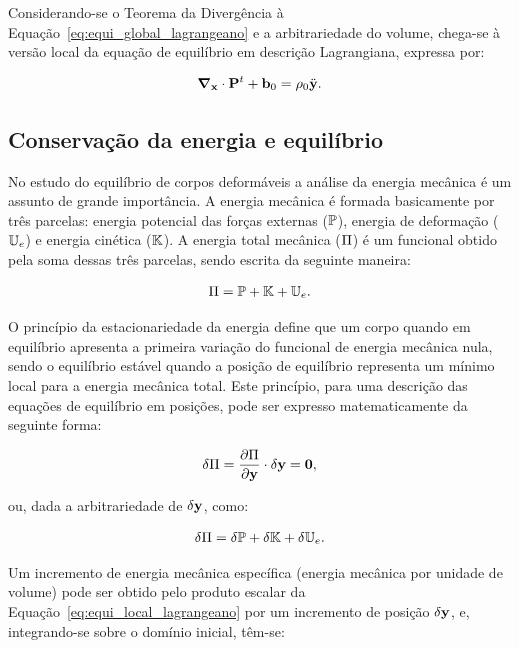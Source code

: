 Considerando-se o Teorema da Divergência à Equação~\eqref{eq:equi_global_lagrangeano} e a arbitrariedade do volume, chega-se à versão local da equação de equilíbrio em descrição Lagrangiana, expressa por:

\begin{align}
	\boldsymbol{\nabla}_{\mathbf{x}} \cdot \mathbf{P}^t +  \mathbf{b}_0 = \rho_0  \ddot{\mathbf{y}}. \label{eq:equi_local_lagrangeano}
\end{align}


\subsection{Conservação da energia e equilíbrio}

No estudo do equilíbrio de corpos deformáveis a análise da energia mecânica é um assunto de grande importância. A energia mecânica é formada basicamente por três parcelas: energia potencial das forças externas ($\mathbb{P}$), energia de deformação ($\mathbb{U}_e$) e energia cinética ($\mathbb{K}$). A energia total mecânica ($\Pi$) é um funcional obtido pela soma dessas três parcelas, sendo escrita da seguinte maneira:

\begin{align}
	\Pi = \mathbb{P} + \mathbb{K} + \mathbb{U}_e.
\end{align}

O princípio da estacionariedade da energia define que um corpo quando em equilíbrio apresenta a primeira variação do funcional de energia mecânica nula, sendo o equilíbrio estável quando a posição de equilíbrio representa um mínimo local para a energia mecânica total. Este princípio, para uma descrição das equações de equilíbrio em posições, pode ser expresso matematicamente da seguinte forma:

\begin{align}
	\delta\Pi = \frac{\partial{\Pi}}{\partial{\mathbf{y}}} \cdot \delta\mathbf{y} = \mathbf{0}, \label{eq:princ_esta}
\end{align}

\noindent ou, dada a arbitrariedade de $\delta\mathbf{y}$, como: 

\begin{align}
	\delta\Pi = \delta\mathbb{P} + \delta\mathbb{K} + \delta\mathbb{U}_e.
\end{align}

Um incremento de energia mecânica específica (energia mecânica por unidade de volume) pode ser obtido pelo produto escalar da Equação~\eqref{eq:equi_local_lagrangeano} por um incremento de posição $\delta\mathbf{y}$, e, integrando-se sobre o domínio inicial, têm-se:

